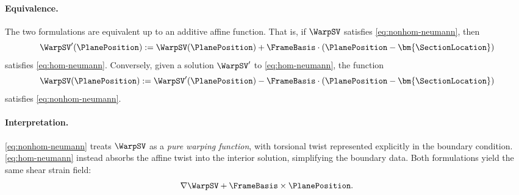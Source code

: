 \paragraph{Equivalence.}
The two formulations are equivalent up to an additive affine function. That is, if \( \WarpSV \) satisfies \cref{eq:nonhom-neumann}, then
\[
\WarpSV'(\PlanePosition) := \WarpSV(\PlanePosition) + \FrameBasis \cdot (\PlanePosition - \bm{\SectionLocation})
\]
satisfies \cref{eq:hom-neumann}. Conversely, given a solution \( \WarpSV' \) to \cref{eq:hom-neumann}, the function
\[
\WarpSV(\PlanePosition) := \WarpSV'(\PlanePosition) - \FrameBasis \cdot (\PlanePosition - \bm{\SectionLocation})
\]
satisfies \cref{eq:nonhom-neumann}.

\paragraph{Interpretation.}
\cref{eq:nonhom-neumann} treats \( \WarpSV \) as a \emph{pure warping function}, with torsional twist represented explicitly in the boundary condition. \cref{eq:hom-neumann} instead absorbs the affine twist into the interior solution, simplifying the boundary data. Both formulations yield the same shear strain field:
\[
\nabla \WarpSV + \FrameBasis \times \PlanePosition.
\]
